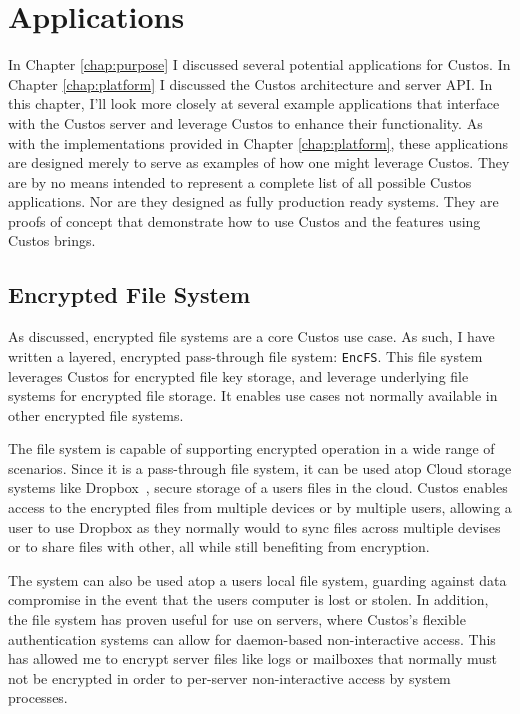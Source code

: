 \chapter{Applications}
\label{chap:clients}

In Chapter \ref{chap:purpose} I discussed several potential
applications for Custos. In Chapter \ref{chap:platform} I discussed
the Custos architecture and server API. In this chapter, I'll look
more closely at several example applications that interface with the
Custos server and leverage Custos to enhance their functionality. As
with the implementations provided in Chapter \ref{chap:platform},
these applications are designed merely to serve as examples of how one
might leverage Custos. They are by no means intended to represent a
complete list of all possible Custos applications. Nor are they
designed as fully production ready systems. They are proofs of concept
that demonstrate how to use Custos and the features using Custos
brings.

\section{Encrypted File System}

As discussed, encrypted file systems are a core Custos use case. As
such, I have written a layered, encrypted pass-through file system:
\texttt{EncFS}. This file system leverages Custos for encrypted file
key storage, and leverage underlying file systems for encrypted file
storage. It enables use cases not normally available in other
encrypted file systems.

The file system is capable of supporting encrypted operation in a wide
range of scenarios. Since it is a pass-through file system, it can be
used atop Cloud storage systems like Dropbox~\cite{dropbox}, secure
storage of a users files in the cloud. Custos enables access to the
encrypted files from multiple devices or by multiple users, allowing a
user to use Dropbox as they normally would to sync files across
multiple devises or to share files with other, all while still
benefiting from encryption.

The system can also be used atop a users local file system, guarding
against data compromise in the event that the users computer is lost
or stolen. In addition, the file system has proven useful for use on
servers, where Custos's flexible authentication systems can allow for
daemon-based non-interactive access. This has allowed me to encrypt
server files like logs or mailboxes that normally must not be
encrypted in order to per-server non-interactive access by system
processes.

